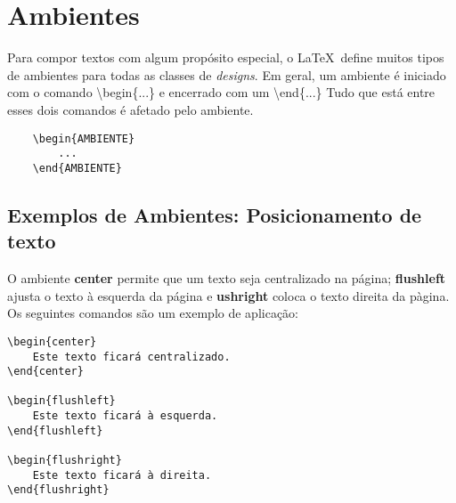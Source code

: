\section{Ambientes}
\begin{frame}[fragile]

Para compor textos com algum propósito especial, o \LaTeX~define
muitos tipos de ambientes para todas as classes de {\it designs}.
Em geral, um ambiente é iniciado com o comando {\code\textbackslash begin\{...\}} e encerrado com
um {\code\textbackslash end\{...\}} Tudo que está entre esses dois comandos é afetado pelo
ambiente.

\vspace{0.5cm}
\begin{center}
\begin{verbatim}
    \begin{AMBIENTE}
        ...
    \end{AMBIENTE}
\end{verbatim}
\end{center}

\end{frame}

\subsection*{Exemplos de Ambientes: Posicionamento de texto} %

\begin{frame}[fragile]
O ambiente {\bf center} permite que um texto seja centralizado na página;
{\bf flushleft} ajusta o texto à esquerda da página e {\bf ushright} coloca o texto
direita da pàgina. Os seguintes comandos são um exemplo de aplicação:

\vspace{0.5cm}
\begin{CenteredBox}
\begin{lstlisting}[linewidth=6.5cm]
\begin{center}
    Este texto ficará centralizado.
\end{center}

\begin{flushleft}
    Este texto ficará à esquerda.
\end{flushleft}

\begin{flushright}
    Este texto ficará à direita.
\end{flushright}
\end{lstlisting}
\end{CenteredBox}

\end{frame}


